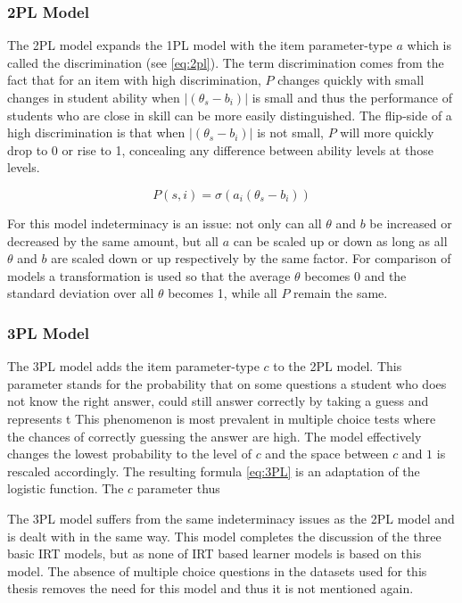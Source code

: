 \documentclass{scrartcl}
\begin{document}
\subsubsection{2PL Model}
The 2PL model expands the 1PL model with the item parameter-type $a$ which is called the discrimination (see \ref{eq:2pl}). The term discrimination comes from the fact that for an item with high discrimination, $P$ changes quickly with small changes in student ability when $|(\theta_{s} - b_{i})|$ is small and thus the performance of students who are close in skill can be more easily distinguished. The flip-side of a high discrimination is that when $|(\theta_{s} - b_{i})|$ is not small, $P$ will more quickly drop to 0 or rise to 1, concealing any difference between ability levels at those levels. 

\begin{equation}
\label{eq:2pl}
P(s,i) = \sigma(a_{i} (\theta_{s} - b_{i}))
\end{equation}

For this model indeterminacy is an issue: not only can all $\theta$ and $b$ be increased or decreased by the same amount, but all $a$ can be scaled up or down as long as all $\theta$ and $b$ are scaled down or up respectively by the same factor. For comparison of models a transformation is used so that the average $\theta$ becomes 0 and the standard deviation over all $\theta$ becomes 1, while all $P$ remain the same. 

\subsubsection{3PL Model}
The 3PL model adds the item parameter-type $c$ to the 2PL model. This parameter stands for the probability that on some questions a student who does not know the right answer, could still answer correctly by taking a guess and represents t This phenomenon is most prevalent in multiple choice tests where the chances of correctly guessing the answer are high. The model effectively changes the lowest probability to the level of $c$ and the space between $c$ and $1$ is rescaled accordingly. The resulting formula \ref{eq:3PL} is an adaptation of the logistic function. The $c$ parameter thus 

The 3PL model suffers from the same indeterminacy issues as the 2PL model and is dealt with in the same way. This model completes the discussion of the three basic IRT models, but as none of IRT based learner models is based on this model. The absence of multiple choice questions in the datasets used for this thesis removes the need for this model and thus it is not mentioned again. 
\end{document}
